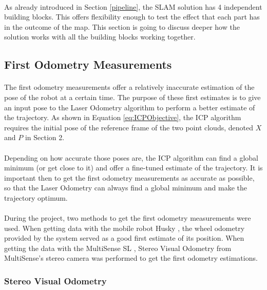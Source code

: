 \documentclass[12pt]{article}
\begin{document}
	\paragraph{}
	As already introduced in Section \ref{pipeline}, the SLAM solution has 4 independent building blocks. This offers flexibility enough to test the effect that each part has in the outcome of the map. This section is going to discuss deeper how the solution works with all the building blocks working together. 
	 
	\subsection{First Odometry Measurements}
	\paragraph{}
	The first odometry measurements offer a relatively inaccurate estimation of the pose of the robot at a certain time. The purpose of these first estimates is to give an input pose to the Laser Odometry algorithm to perform a better estimate of the trajectory. As shown in Equation \ref{eq:ICPObjective}, the ICP algorithm requires the initial pose of the reference frame of the two point clouds, denoted $X$ and $P$ in Section 2.

	\paragraph{}	
	Depending on how accurate those poses are, the ICP algorithm can find a global minimum (or get close to it) and offer a fine-tuned estimate of the trajectory. It is important then to get the first odometry measurements as accurate as possible, so that the Laser Odometry can always find a global minimum and make the trajectory optimum.
	
	\paragraph{}
	During the project, two methods to get the first odometry measurements were used. When getting data with the mobile robot Husky \cite{Husky}, the wheel odometry provided by the system served as a good first estimate of its position. When getting the data with the MultiSense SL \cite{multisense}, Stereo Visual Odometry from MultiSense's stereo camera was performed to get the first odometry estimations.
	
	\subsubsection*{Stereo Visual Odometry}
\end{document}
